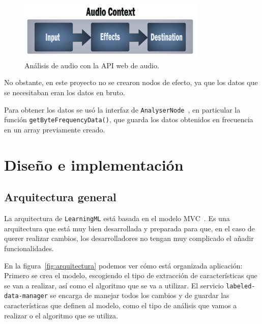 \documentclass[a4paper, 12pt]{book}
\begin{document}
\begin{figure}
	\centering
	\includegraphics[width=9cm, keepaspectratio]{img/web-audio-api.png}
	\caption{Análisis de audio con la API web de audio.}\label{fig:audio-api}
\end{figure}

No obstante, en este proyecto no se crearon nodos de efecto, ya que los datos que se necesitaban eran los datos en bruto.

Para obtener los datos se usó la interfaz de \texttt{AnalyserNode}~\cite{analyser-node}, en particular la función \texttt{getByteFrequencyData()}, que guarda los datos obtenidos en frecuencia en un array previamente creado.


\cleardoublepage
\chapter{Diseño e implementación}
\label{chap:diseño-implementacion}

\section{Arquitectura general} 
\label{sec:arquitectura}

La arquitectura de \texttt{LearningML} está basada en el modelo MVC~\cite{mvc}. Es una arquitectura que está muy bien desarrollada y preparada para que, en el caso de querer realizar cambios, los desarrolladores no tengan muy complicado el añadir funcionalidades.

En la figura~\ref{fig:arquitectura} podemos ver cómo está organizada aplicación: Primero se crea el modelo, escogiendo el tipo de extracción de características que se van a realizar, así como el algoritmo que se va a utilizar. El servicio \texttt{labeled-data-manager} se encarga de manejar todos los cambios y de guardar las características que definen al modelo, como el tipo de análisis que vamos a realizar o el algoritmo que se utiliza.
\end{document}
